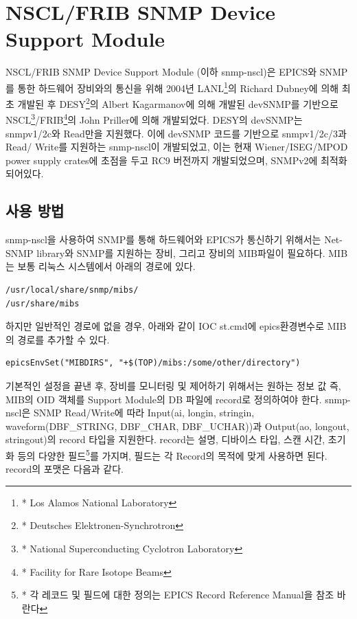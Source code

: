 \documentclass[11pt
  , a4paper
  , article
  , oneside
]{memoir}
\begin{document}
\section{NSCL/FRIB SNMP Device Support Module}
NSCL/FRIB SNMP Device Support Module (이하 snmp-nscl)은 EPICS와 SNMP를 통한 하드웨어 장비와의 통신을 위해 2004년 LANL\footnote{* Los Alamos National Laboratory}의 Richard Dubney에 의해 최초 개발된 후 DESY\footnote{* Deutsches Elektronen-Synchrotron}의 Albert Kagarmanov에 의해 개발된 devSNMP를 기반으로 NSCL\footnote{* National Superconducting Cyclotron Laboratory}/FRIB\footnote{* Facility for Rare Isotope Beams}의 John Priller에 의해 개발되었다. DESY의 devSNMP는 snmpv1/2c와 Read만을 지원했다. 이에 devSNMP 코드를 기반으로 snmpv1/2c/3과 Read/ Write를 지원하는 snmp-nscl이 개발되었고, 이는 현재 Wiener/ISEG/MPOD power supply crates에 초점을 두고 RC9 버전까지 개발되었으며, SNMPv2에 최적화 되어있다\citep{devsnmp}. 

\subsection{사용 방법}
snmp-nscl을 사용하여 SNMP를 통해 하드웨어와 EPICS가 통신하기 위해서는 Net-SNMP library와 SNMP를 지원하는 장비, 그리고 장비의 MIB파일이 필요하다. MIB는 보통 리눅스 시스템에서 아래의 경로에 있다.

\begin{lstlisting}[style=termstyle]
/usr/local/share/snmp/mibs/ 
/usr/share/mibs
\end{lstlisting}

하지만 일반적인 경로에 없을 경우, 아래와 같이 IOC st.cmd에 epics환경변수로 MIB의 경로를 추가할 수 있다.

\begin{lstlisting}[style=termstyle]
epicsEnvSet("MIBDIRS", "+$(TOP)/mibs:/some/other/directory")
\end{lstlisting}

기본적인 설정을 끝낸 후, 장비를 모니터링 및 제어하기 위해서는 원하는 정보 값 즉, MIB의 OID 객체를 Support Module의 DB 파일에 record로 정의하여야 한다. snmp-nscl은 SNMP Read/Write에 따라 Input(ai, longin, stringin, waveform(DBF\_STRING, DBF\_CHAR, DBF\_UCHAR))과 Output(ao, longout, stringout)의 record 타입을 지원한다. record는 설명, 디바이스 타입, 스캔 시간, 초기화 등의 다양한 필드\footnote{* 각 레코드 및 필드에 대한 정의는 EPICS Record Reference Manual\citep{record}을 참조 바란다}를 가지며, 필드는 각 Record의 목적에 맞게 사용하면 된다. record의 포맷은 다음과 같다. 

\clearpage
\end{document}
